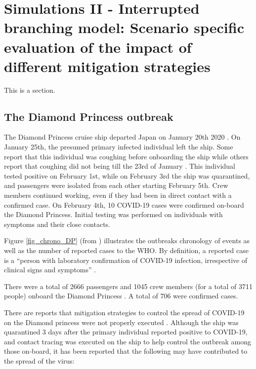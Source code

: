 \documentclass[sr]{drdc-report}
\begin{document}
\newpage

\section{Simulations II - Interrupted branching model: Scenario specific evaluation of the impact of different mitigation strategies}\label{Scenario_II_section_label}
This is a section.

\subsection{The Diamond Princess outbreak}

The Diamond Princess cruise ship departed Japan on January 20th 2020 \cite{10..15585/mmwr..mm6912e3}. On January 25th, the presumed primary infected individual left the ship. Some report that this individual was coughing before onboarding the ship \cite{10..1016/j..ijid..2020..02..033} while others report that coughing did not being till the 23rd of January \cite{news_patient_zero}. This individual tested positive on February 1st, while on February 3rd the ship was quarantined, and passengers were isolated from each other starting February 5th. Crew members continued working, even if they had been in direct contact with a confirmed case. On February 4th, 10 COVID-19 cases were confirmed on-board the Diamond Princess. Initial testing was performed on individuals with symptoms and their close contacts. 

Figure \ref{fig_chrono_DP}  (from \cite{10..15585/mmwr..mm6912e3}) illustrates the outbreaks chronology of events as well as the number of reported cases to the WHO. By definition, a reported case is a “person with laboratory confirmation of COVID-19 infection, irrespective of clinical signs and symptoms” \cite{WHO_surv}. 

There were a total of 2666 passengers and 1045 crew members (for a total of 3711 people) onboard the Diamond Princess \cite{10..15585/mmwr..mm6912e3}. A total of 706 were confirmed cases.  

There are reports that mitigation strategies to control the spread of COVID-19 on the Diamond princess were not properly executed \cite{10..1002/jgf2..326}. Although the ship was quarantined 3 days after the primary individual reported positive to COVID-19, and contact tracing was executed on the ship to help control the outbreak among those on-board, it has been reported that the following may have contributed to the spread of the virus:
\end{document}
